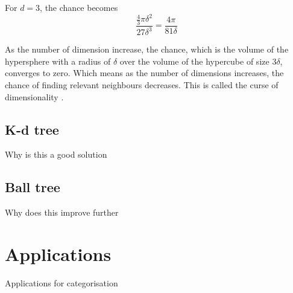 For $d=3$, the chance becomes
\[ \frac{\frac{4}{3} \pi \delta^2}{27 \delta^3} = \frac{4 \pi}{81 \delta} \]

As the number of dimension increase, the chance, which is the volume of the hypersphere with a radius of $\delta$ over the volume of the hypercube of size $3\delta$, converges to zero. Which means as the number of dimensions increases, the chance of finding relevant neighbours decreases. This is called the curse of dimensionality \cite{curse}.

\subsection{K-d tree}
\label{subsec:cluster_knn_kdtree}

Why is this a good solution

\subsection{Ball tree}
\label{subsec:cluster_knn_balltree}

Why does this improve further

\section{Applications}
\label{sec:cluster_applications}

Applications for categorisation
